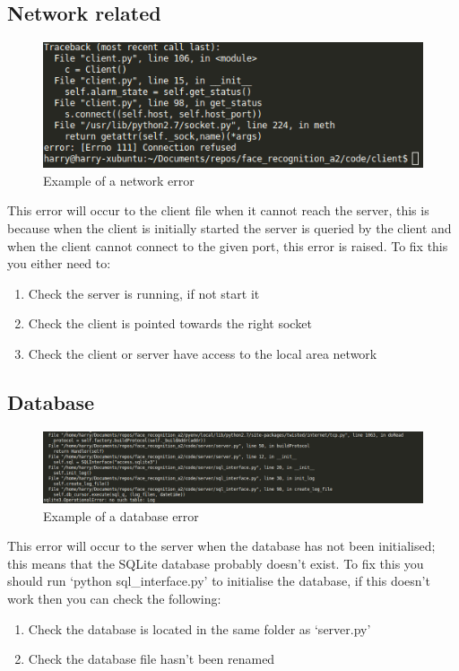 \documentclass[a4paper]{article}
\begin{document}
    \subsection{Network related}
        \begin{figure}[H]
            \centering
            \caption{Example of a network error}
            \label{fig:networkcrash}
                \includegraphics[scale=0.5]{../shared_assets/screenshots/manual/networkcrash.png}
        \end{figure} 
        This error will occur to the client file when it cannot reach the server, this is because when the client is initially started the 
        server is queried by the client and when the client cannot connect to the given port, this error is raised. To fix this you either
        need to:
        \begin{enumerate}
            \item Check the server is running, if not start it
            \item Check the client is pointed towards the right socket
            \item Check the client or server have access to the local area network
        \end{enumerate}

    \subsection{Database}
        \begin{figure}[H]
        \centering
        \caption{Example of a database error}
        \label{fig:db404}
            \includegraphics[scale=0.4]{../shared_assets/screenshots/manual/db404.png}
    \end{figure} 
    This error will occur to the server when the database has not been initialised; this means that the SQLite database probably doesn't exist.
    To fix this you should run `python sql\_interface.py' to initialise the database, if this doesn't work then you can check the following:
    \begin{enumerate}
        \item Check the database is located in the same folder as `server.py'
        \item Check the database file hasn't been renamed
    \end{enumerate}
\newpage
\end{document}
